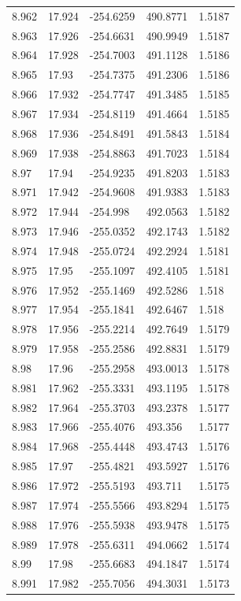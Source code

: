 \begin{tabular}{lllll}
8.962 & 17.924 & -254.6259 & 490.8771 & 1.5187 \\
8.963 & 17.926 & -254.6631 & 490.9949 & 1.5187 \\
8.964 & 17.928 & -254.7003 & 491.1128 & 1.5186 \\
8.965 & 17.93 & -254.7375 & 491.2306 & 1.5186 \\
8.966 & 17.932 & -254.7747 & 491.3485 & 1.5185 \\
8.967 & 17.934 & -254.8119 & 491.4664 & 1.5185 \\
8.968 & 17.936 & -254.8491 & 491.5843 & 1.5184 \\
8.969 & 17.938 & -254.8863 & 491.7023 & 1.5184 \\
8.97 & 17.94 & -254.9235 & 491.8203 & 1.5183 \\
8.971 & 17.942 & -254.9608 & 491.9383 & 1.5183 \\
8.972 & 17.944 & -254.998 & 492.0563 & 1.5182 \\
8.973 & 17.946 & -255.0352 & 492.1743 & 1.5182 \\
8.974 & 17.948 & -255.0724 & 492.2924 & 1.5181 \\
8.975 & 17.95 & -255.1097 & 492.4105 & 1.5181 \\
8.976 & 17.952 & -255.1469 & 492.5286 & 1.518 \\
8.977 & 17.954 & -255.1841 & 492.6467 & 1.518 \\
8.978 & 17.956 & -255.2214 & 492.7649 & 1.5179 \\
8.979 & 17.958 & -255.2586 & 492.8831 & 1.5179 \\
8.98 & 17.96 & -255.2958 & 493.0013 & 1.5178 \\
8.981 & 17.962 & -255.3331 & 493.1195 & 1.5178 \\
8.982 & 17.964 & -255.3703 & 493.2378 & 1.5177 \\
8.983 & 17.966 & -255.4076 & 493.356 & 1.5177 \\
8.984 & 17.968 & -255.4448 & 493.4743 & 1.5176 \\
8.985 & 17.97 & -255.4821 & 493.5927 & 1.5176 \\
8.986 & 17.972 & -255.5193 & 493.711 & 1.5175 \\
8.987 & 17.974 & -255.5566 & 493.8294 & 1.5175 \\
8.988 & 17.976 & -255.5938 & 493.9478 & 1.5175 \\
8.989 & 17.978 & -255.6311 & 494.0662 & 1.5174 \\
8.99 & 17.98 & -255.6683 & 494.1847 & 1.5174 \\
8.991 & 17.982 & -255.7056 & 494.3031 & 1.5173 \\

\end{tabular}
